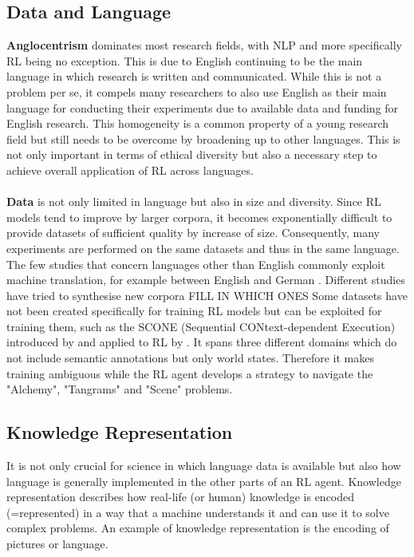 \documentclass[11pt,a4paper]{article}
\begin{document}
\subsection{Data and Language}
\textbf{Anglocentrism} dominates most research fields, with NLP and more specifically RL being no exception. This is due to English continuing to be the main language in which research is written and communicated. While this is not a problem per se, it compels many researchers to also use English as their main language for conducting their experiments due to available data and funding for English research. This homogeneity is a common property of a young research field but still needs to be overcome by broadening up to other languages. This is not only important in terms of ethical diversity but also a necessary step to achieve overall application of RL across languages. \\\\
\textbf{Data} is not only limited in language but also in size and diversity. Since RL models tend to improve by larger corpora, it becomes exponentially difficult to provide datasets of sufficient quality by increase of size. Consequently, many experiments are performed on the same datasets and thus in the same language. The few studies that concern languages other than English commonly exploit machine translation, for example between English and German \citet{yasui-etal-2019}. Different studies have tried to synthesise new corpora FILL IN WHICH ONES
Some datasets have not been created specifically for training RL models but can be exploited for training them, such as the SCONE (Sequential CONtext-dependent Execution) introduced by \citet{long-2016} and applied to RL by \cite{guu-etal-2017-language}. It spans three different domains which do not include semantic annotations but only world states. Therefore it makes training ambiguous while the RL agent develops a strategy to navigate the "Alchemy", "Tangrams" and "Scene" problems.

\subsection{Knowledge Representation}
It is not only crucial for science in which language data is available but also how language is generally implemented in the other parts of an RL agent. Knowledge representation describes how real-life (or human) knowledge is encoded (=represented) in a way that a machine understands it and can use it to solve complex problems. An example of knowledge representation is the encoding of pictures or language.
\par
\end{document}
